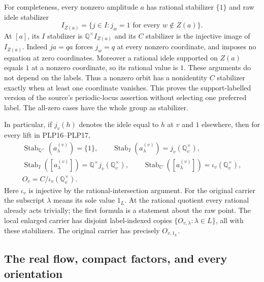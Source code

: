 For completeness, every nonzero amplitude $a$ has rational
stabilizer $\{1\}$ and raw idele stabilizer
\begin{equation}\tag{PLP18}
I_{Z(a)}=\{j\in I:j_w=1\text{ for every }w\notin Z(a)\}.
\end{equation}
At $[a]$, its $I$ stabilizer is $\mathbb Q^\times I_{Z(a)}$
and its $C$ stabilizer is the injective image of $I_{Z(a)}$.
Indeed $ja=qa$ forces $j_w=q$ at every nonzero coordinate,
and imposes no equation at zero coordinates. Moreover a rational
idele supported on $Z(a)$ equals $1$ at a nonzero coordinate,
so its rational value is $1$. These arguments do not depend on
the labels. Thus a nonzero orbit has a nonidentity $C$ stabilizer
exactly when at least one coordinate vanishes. This proves the
support-labelled version of the source's periodic-locus assertion
without selecting one preferred label. The all-zero cases have
the whole group as stabilizer.

In particular, if $j_v(h)$ denotes the idele equal to $h$ at $v$
and $1$ elsewhere, then for every lift in PLP16--PLP17,
\begin{equation}\tag{PLP19}
\begin{gathered}
\operatorname{Stab}_{\mathbb Q^\times}(a^{(v)}_\lambda)=\{1\},
\qquad
\operatorname{Stab}_{I}(a^{(v)}_\lambda)=j_v(\mathbb Q_v^\times),\\
\operatorname{Stab}_{I}([a^{(v)}_\lambda])
=\mathbb Q^\times j_v(\mathbb Q_v^\times),\qquad
\operatorname{Stab}_{C}([a^{(v)}_\lambda])
=\iota_v(\mathbb Q_v^\times),\\
O_v=C/\iota_v(\mathbb Q_v^\times).
\end{gathered}
\end{equation}
Here $\iota_v$ is injective by the rational-intersection argument.
For the original carrier the subscript $\lambda$ means its sole
value $1_L$. At the rational quotient every rational already acts
trivially; the first formula is a statement about the raw point.
The local enlarged carrier has disjoint label-indexed copies
$\{O_{v,\lambda}:\lambda\in L\}$, all with these stabilizers.
The original carrier has precisely $O_{v,1_L}$.

\subsection{The real flow, compact factors, and every orientation}

